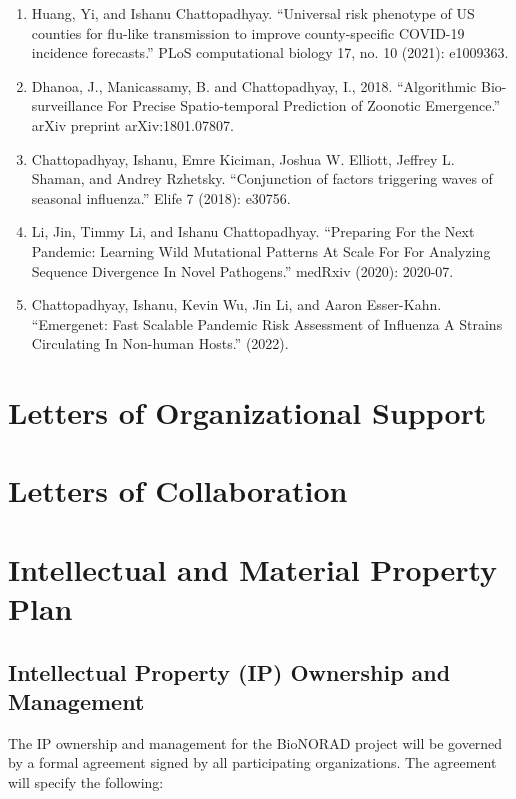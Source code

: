 \documentclass[onecolumn, compsoc,12pt]{IEEEtran}
\begin{document}
\begin{enumerate} 
[label=$\square$, leftmargin=0pt,
labelindent=0em, topsep=0.1em, labelsep=*, itemsep=.5em,itemindent=1em]
\item Huang, Yi, and Ishanu Chattopadhyay. ``Universal risk phenotype of US counties for flu-like transmission to improve county-specific COVID-19 incidence forecasts.'' PLoS computational biology 17, no. 10 (2021): e1009363.

\item Dhanoa, J., Manicassamy, B. and Chattopadhyay, I., 2018. ``Algorithmic Bio-surveillance For Precise Spatio-temporal Prediction of Zoonotic Emergence.'' arXiv preprint arXiv:1801.07807.

\item Chattopadhyay, Ishanu, Emre Kiciman, Joshua W. Elliott, Jeffrey L. Shaman, and Andrey Rzhetsky. ``Conjunction of factors triggering waves of seasonal influenza.'' Elife 7 (2018): e30756.

\item Li, Jin, Timmy Li, and Ishanu Chattopadhyay. ``Preparing For the Next Pandemic: Learning Wild Mutational Patterns At Scale For For Analyzing Sequence Divergence In Novel Pathogens.'' medRxiv (2020): 2020-07.

  \item Chattopadhyay, Ishanu, Kevin Wu, Jin Li, and Aaron Esser-Kahn. ``Emergenet: Fast Scalable Pandemic Risk Assessment of Influenza A Strains Circulating In Non-human Hosts.'' (2022).

\end{enumerate}

\clearpage

\section*{Letters of Organizational Support}

\clearpage

\section*{Letters of Collaboration}
\clearpage

\section*{Intellectual and Material Property Plan}

\subsection{Intellectual Property (IP) Ownership and Management}
The IP ownership and management for the BioNORAD project will be governed by a formal agreement signed by all participating organizations. The agreement will specify the following:
\end{document}
